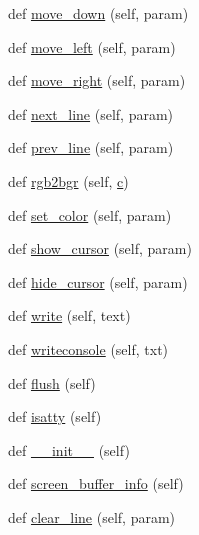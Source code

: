 \begin{DoxyCompactItemize}
\item 
def \hyperlink{classwaflib_1_1ansiterm_1_1_ansi_term_a7b2ea0403457b7cd8d0ac4088064d812}{move\+\_\+down} (self, param)
\item 
def \hyperlink{classwaflib_1_1ansiterm_1_1_ansi_term_a617dda0ced0a3e3f3443366d4a1c46bb}{move\+\_\+left} (self, param)
\item 
def \hyperlink{classwaflib_1_1ansiterm_1_1_ansi_term_a1388984c5cb5051d6c48682d1cd998b7}{move\+\_\+right} (self, param)
\item 
def \hyperlink{classwaflib_1_1ansiterm_1_1_ansi_term_a8ce79cf478dc1bf0cec2c12e28103522}{next\+\_\+line} (self, param)
\item 
def \hyperlink{classwaflib_1_1ansiterm_1_1_ansi_term_ac65f3453904e9c561f530b7c43e73f12}{prev\+\_\+line} (self, param)
\item 
def \hyperlink{classwaflib_1_1ansiterm_1_1_ansi_term_ad097d16ecb1babcef5970faccad1e7e9}{rgb2bgr} (self, \hyperlink{rfft2d_test_m_l_8m_ae0323a9039add2978bf5b49550572c7c}{c})
\item 
def \hyperlink{classwaflib_1_1ansiterm_1_1_ansi_term_a2b56ee3c8294f7e2e5bca7cc60e8ee05}{set\+\_\+color} (self, param)
\item 
def \hyperlink{classwaflib_1_1ansiterm_1_1_ansi_term_a594f6cf62d5e4ca33f2b88127fd6393d}{show\+\_\+cursor} (self, param)
\item 
def \hyperlink{classwaflib_1_1ansiterm_1_1_ansi_term_a2ca4bde33edd4afa92c8bda3f01d1dc9}{hide\+\_\+cursor} (self, param)
\item 
def \hyperlink{classwaflib_1_1ansiterm_1_1_ansi_term_a03ecdf1c9e54a69800aae320175c281b}{write} (self, text)
\item 
def \hyperlink{classwaflib_1_1ansiterm_1_1_ansi_term_a8296f875a3fd0a03fc109073f2a73a3e}{writeconsole} (self, txt)
\item 
def \hyperlink{classwaflib_1_1ansiterm_1_1_ansi_term_a08667242c11cdfd8b74d64f8191d4938}{flush} (self)
\item 
def \hyperlink{classwaflib_1_1ansiterm_1_1_ansi_term_a08e698612e76adc1aa3e26cdc5cb2009}{isatty} (self)
\item 
def \hyperlink{classwaflib_1_1ansiterm_1_1_ansi_term_ab397a7401f836bb9f96d9e54c6333821}{\+\_\+\+\_\+init\+\_\+\+\_\+} (self)
\item 
def \hyperlink{classwaflib_1_1ansiterm_1_1_ansi_term_afdb1bac8f2508bdf2279320b85286196}{screen\+\_\+buffer\+\_\+info} (self)
\item 
def \hyperlink{classwaflib_1_1ansiterm_1_1_ansi_term_ae9df276c42e0569ad63c20c19de62b93}{clear\+\_\+line} (self, param)

\end{DoxyCompactItemize}
